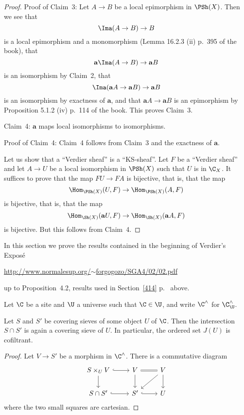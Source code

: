 \documentclass[12pt]{article}
\theoremstyle{remark}
\theoremstyle{definition}
\begin{document}
\begin{proof}
\nn Proof of Claim~3: Let $A\to B$ be a local epimorphism in $\PSh(X)$. Then we see that 
$$
\Ima(A\to B)\to B
$$ 
is a local epimorphism and a monomorphism (Lemma 16.2.3 (ii) p.~395 of the book), that 
$$
\mathbf a\Ima(A\to B)\to\mathbf aB
$$ 
is an isomorphism by Claim~2, that 
$$
\Ima(\mathbf aA\to\mathbf aB)\to\mathbf aB
$$ 
is an isomorphism by exactness of $\mathbf a$, and that $\mathbf aA\to\mathbf aB$ is an epimorphism by Proposition 5.1.2 (iv) p.~114 of the book. This proves Claim~3. 

\nn Claim~4: $\mathbf a$ maps local isomorphisms to isomorphisms.

\nn Proof of Claim~4: Claim~4 follows from Claim~3 and the exactness of $\mathbf a$.

Let us show that a ``Verdier sheaf'' is a ``KS-sheaf''. Let $F$ be a ``Verdier sheaf'' and let $A\to U$ be a local isomorphism in $\PSh(X)$ such that $U$ is in $\C_X$. It suffices to prove that the map $FU\to FA$ is bijective, that is, that the map 
$$
\Hom_{\PSh(X)}(U,F)\to\Hom_{\PSh(X)}(A,F)
$$ 
is bijective, that is, that the map
$$
\Hom_{\Sh(X)}(\mathbf aU,F)\to\Hom_{\Sh(X)}(\mathbf aA,F)
$$ 
is bijective. But this follows from Claim~4.
\end{proof}

%


In this section we prove the results contained in the beginning of Verdier's Exposé\medskip 

\centerline{\href{http://www.normalesup.org/~forgogozo/SGA4/02/02.pdf}{http://www.normalesup.org/$\sim$forgogozo/SGA4/02/02.pdf}}

\noindent up to Proposition~4.2, results used in Section~\ref{414} p.~\pageref{414} above.

Let $\C$ be a site and $\U$ a universe such that $\C\in\U$, and write $\C^\wedge$ for $\C^\wedge_\U$.

\begin{lem}[1.1.1]
Let $S$ and $S'$ be covering sieves of some object $U$ of $\C$. Then the intersection $S\cap S'$ is again a covering sieve of $U$. In particular, the ordered set $J(U)$ is cofiltrant.
\end{lem}
%
\begin{proof}
Let $V\to S'$ be a morphism in $\C^\wedge$. There is a commutative diagram 
$$
\begin{tikzcd}
S\times_UV\ar[d]\ar[r,hookrightarrow]&V\ar[d]\ar[r,equal]&V\ar[d]\ar[dl]\\ 
S\cap S'\ar[r,hookrightarrow]&S'\ar[r,hookrightarrow]&U
\end{tikzcd}
$$ 
where the two small squares are cartesian.
\end{proof}
\end{document}

